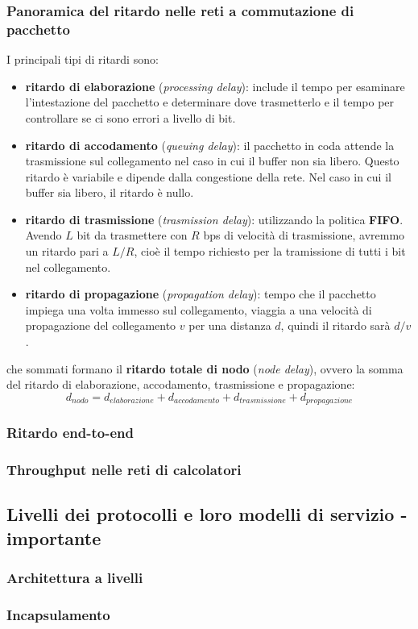 \subsubsection{Panoramica del ritardo nelle reti a commutazione di pacchetto}
I principali tipi di ritardi sono:
\begin{itemize}
  \item \textbf{ritardo di elaborazione} (\textit{processing delay}): include il tempo per esaminare l'intestazione del pacchetto e determinare dove trasmetterlo e il tempo per controllare se ci sono errori a livello di bit.  
  \item \textbf{ritardo di accodamento} (\textit{queuing delay}): il pacchetto in coda attende la trasmissione sul collegamento nel caso in cui il buffer non sia libero. Questo ritardo è variabile e dipende dalla congestione della rete. Nel caso in cui il buffer sia libero, il ritardo è nullo.
  \item \textbf{ritardo di trasmissione} (\textit{trasmission delay}): utilizzando la politica \textbf{FIFO}. Avendo $L$ bit da trasmettere con $R$ bps di velocità di trasmissione, avremmo un ritardo pari a $L/R$, cioè il tempo richiesto per la tramissione di tutti i bit nel collegamento. 
  \item \textbf{ritardo di propagazione} (\textit{propagation delay}): tempo che il pacchetto impiega una volta immesso sul collegamento, viaggia a una velocità di propagazione del collegamento $v$ per una distanza $d$, quindi il ritardo sarà $d/v$.  
\end{itemize}
che sommati formano il \textbf{ritardo totale di nodo} (\textit{node delay}), ovvero la somma del ritardo di elaborazione, accodamento, trasmissione e propagazione:
\[
  d_{nodo} = d_{elaborazione} + d_{accodamento} + d_{trasmissione} + d_{propagazione} 
\]

\subsubsection{Ritardo end-to-end} 
\subsubsection{Throughput nelle reti di calcolatori} 

\subsection{Livelli dei protocolli e loro modelli di servizio - importante} 
\subsubsection{Architettura a livelli}
\subsubsection{Incapsulamento}

